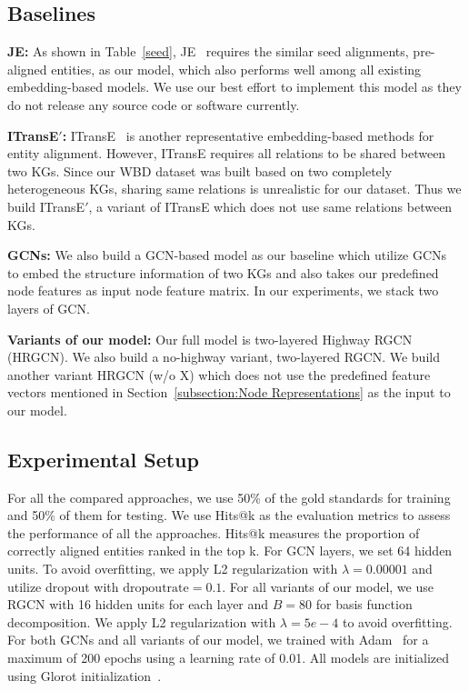 	\subsection{Baselines}
	
	\noindent \textbf{JE:} As shown in Table~\ref{seed}, JE~\cite{hao2016joint} requires the similar seed alignments, pre-aligned entities, as our model, which also performs well among all existing embedding-based models. We use our best effort to implement this model as they do not release any source code or software currently.
	
	\noindent \textbf{ITransE$'$:} ITransE~\cite{zhu2017iterative} is another representative embedding-based methods for entity alignment. However, ITransE requires all relations to be shared between two KGs. Since our WBD dataset was built based on two completely heterogeneous KGs, sharing same relations is unrealistic for our dataset. Thus we build ITransE$'$, a variant of ITransE which does not use same relations between KGs.
	
	\noindent \textbf{GCNs:} We also build a GCN-based model as our baseline which utilize GCNs~\cite{Kipf2016Semi} to embed the structure information of two KGs and also takes our predefined node features as input node feature matrix. In our experiments, we stack two layers of GCN.
	
	\noindent \textbf{Variants of our model:} Our full model is two-layered Highway RGCN (HRGCN). We also build a no-highway variant, two-layered RGCN. We build another variant HRGCN (w/o X) which does not use the predefined feature vectors mentioned in Section~\ref{subsection:Node Representations} as the input to our model.
	
	\subsection{Experimental Setup}
	For all the compared approaches, we use 50\% of the gold standards for training and 50\% of them for testing. We use Hits@k as the evaluation metrics to assess the performance of all the approaches. Hits@k measures the proportion of correctly aligned entities ranked in the top k.
	For GCN layers, we set 64 hidden units. To avoid overfitting, we apply L2 regularization with $\lambda=0.00001$ and utilize dropout with $\mathrm{dropout rate}=0.1$.
	For all variants of our model, we use RGCN with 16 hidden units for each layer and $B = 80$ for basis function decomposition. We apply L2 regularization with $\lambda=5e-4$ to avoid overfitting.
	For both GCNs and all variants of our model, we trained with Adam~\cite{Kingma2014Adam} for a maximum of 200 epochs using a learning rate of 0.01. All models are initialized using Glorot initialization~\cite{Glorot2010Understanding}.
	
